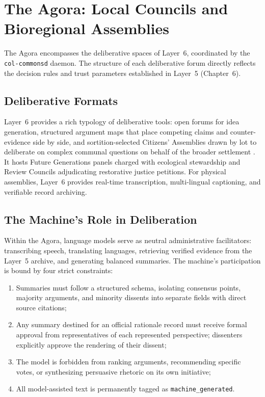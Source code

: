 \section{The Agora: Local Councils and Bioregional Assemblies}

The Agora encompasses the deliberative spaces of Layer~6, coordinated by the \texttt{col-commonsd} daemon. The structure of each deliberative forum directly reflects the decision rules and trust parameters established in Layer~5 (Chapter~6).

\subsection{Deliberative Formats}

Layer~6 provides a rich typology of deliberative tools: open forums for idea generation, structured argument maps that place competing claims and counter-evidence side by side, and sortition-selected Citizens' Assemblies drawn by lot to deliberate on complex communal questions on behalf of the broader settlement \parencite{fishkin1991}. It hosts Future Generations panels charged with ecological stewardship and Review Councils adjudicating restorative justice petitions. For physical assemblies, Layer~6 provides real-time transcription, multi-lingual captioning, and verifiable record archiving.

\subsection{The Machine's Role in Deliberation}

Within the Agora, language models serve as neutral administrative facilitators: transcribing speech, translating languages, retrieving verified evidence from the Layer~5 archive, and generating balanced summaries. The machine's participation is bound by four strict constraints:
\begin{enumerate}
  \item Summaries must follow a structured schema, isolating consensus points, majority arguments, and minority dissents into separate fields with direct source citations;
  \item Any summary destined for an official rationale record must receive formal approval from representatives of each represented perspective; dissenters explicitly approve the rendering of their dissent;
  \item The model is forbidden from ranking arguments, recommending specific votes, or synthesizing persuasive rhetoric on its own initiative;
  \item All model-assisted text is permanently tagged as \texttt{machine\_generated}.
\end{enumerate}

